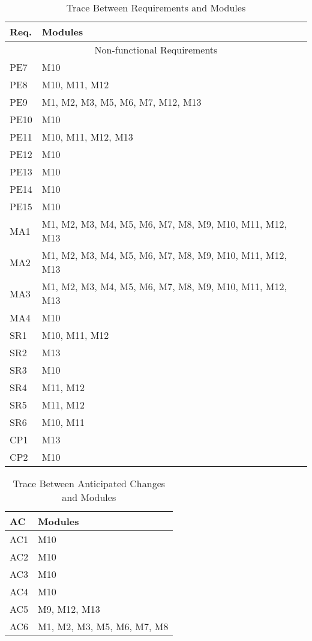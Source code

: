 \documentclass[12pt, titlepage]{article}
\begin{document}
\begin{table}[H]
\centering
\begin{tabular}{p{} p{}}
\toprule
\textbf{Req.} & \textbf{Modules}\\
\midrule
\multicolumn{2}{c}{Non-functional Requirements}\\
\midrule
PE7 & M10\\
PE8 & M10, M11, M12\\
PE9 & M1, M2, M3, M5, M6, M7, M12, M13\\
PE10 & M10\\
PE11 & M10, M11, M12, M13\\
PE12 & M10\\
PE13 & M10\\
PE14 & M10\\
PE15 & M10\\
MA1 & M1, M2, M3, M4, M5, M6, M7, M8, M9, M10, M11, M12, M13\\
MA2 & M1, M2, M3, M4, M5, M6, M7, M8, M9, M10, M11, M12, M13\\
MA3 & M1, M2, M3, M4, M5, M6, M7, M8, M9, M10, M11, M12, M13\\
MA4 & M10\\
SR1 & M10, M11, M12\\
SR2 & M13\\
SR3 & M10\\
SR4 & M11, M12\\
SR5 & M11, M12\\
SR6 & M10, M11\\
CP1 & M13\\
CP2 & M10\\

\bottomrule
\end{tabular}
\caption{Trace Between Requirements and Modules}
\label{TblRT}
\end{table}

\begin{table}[H]
\centering
\begin{tabular}{p{} p{}}
\toprule
\textbf{AC} & \textbf{Modules}\\
\midrule
AC1 & M10\\
AC2 & M10\\
AC3 & M10\\
AC4 & M10\\
AC5 & M9, M12, M13\\
AC6 & M1, M2, M3, M5, M6, M7, M8\\
\bottomrule
\end{tabular}
\caption{Trace Between Anticipated Changes and Modules}
\label{TblACT}
\end{table}
\end{document}
